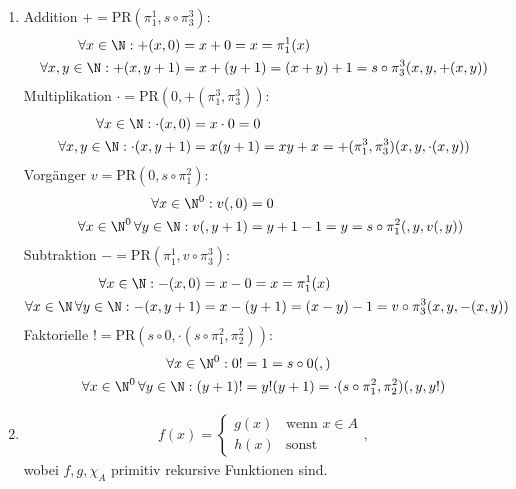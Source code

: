 
\begin{solution}
	\phantom{}
	\begin{enumerate}
		\item Addition $ + = \mathrm{PR}(\pi_1^1, s\circ\pi_3^3)$:
			\begin{align*}
			\forall x \in \N : +(x,0) &= x + 0 = x = \pi_1^1(x) \\
			\forall x, y \in \N : +(x,y+1) &= x + (y + 1) = (x + y) + 1 = s\circ \pi_3^3(x,y,+(x,y))
			\end{align*}
			Multiplikation $\cdot =\mathrm{PR}(0,+(\pi_1^3,\pi_3^3))$:
			\begin{align*}
			\forall x \in \N : \cdot(x,0) &= x \cdot 0 = 0 \\
			\forall x,y \in \N: \cdot(x,y+1) &= x(y+ 1) = xy + x = +(\pi_1^3,\pi_3^3)(x,y,\cdot(x,y))
			\end{align*}
			Vorgänger $v = \mathrm{PR}(0,s\circ\pi_1^2)$:
			\begin{align*}
			 \forall x \in \N^0: v(,0) &= 0 \\
			 \quad \forall x \in \N^0\, \forall y \in \N:v(,y+1) &= y + 1 - 1 = y = s\circ \pi_1^2(,y,v(,y))
			\end{align*}
			Subtraktion $- = \mathrm{PR}(\pi_1^1,v\circ\pi_3^3)$:
			\begin{align*}
			\forall x \in \N: -(x,0) &= x - 0 = x = \pi_1^1(x)\\
			\forall x \in \N\, \forall y \in \N: -(x,y+1) &= x - (y + 1) = (x - y) - 1 = v\circ\pi_3^3(x,y,-(x,y))
			\end{align*}
			Faktorielle $! = \mathrm{PR}(s\circ0,\cdot(s\circ\pi_1^2,\pi_2^2))$:
			\begin{align*}
				\forall x \in \N^0: 0! &= 1 = s\circ 0(,)\\
				\forall x \in \N^0\, \forall y \in \N: (y + 1)! &= y! (y + 1) = \cdot(s\circ\pi_1^2,\pi_2^2)(,y,y!)
			\end{align*}
		\item
			\begin{align*}
			f(x) = \begin{cases}
			g(x) & \text{wenn } x \in A \\
			h(x) & \text{sonst}
			\end{cases},
			\end{align*}
			wobei $f,g, \chi_A$ primitiv rekursive Funktionen sind.
			\begin{align*}

\end{align*}
\end{enumerate}
\end{solution}
